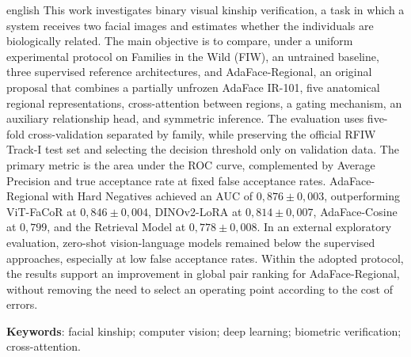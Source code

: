 \begin{resumo}[Abstract]
\begin{otherlanguage*}{english}
This work investigates binary visual kinship verification, a task in which a system receives two facial images and estimates whether the individuals are biologically related. The main objective is to compare, under a uniform experimental protocol on Families in the Wild (FIW), an untrained baseline, three supervised reference architectures, and AdaFace-Regional, an original proposal that combines a partially unfrozen AdaFace IR-101, five anatomical regional representations, cross-attention between regions, a gating mechanism, an auxiliary relationship head, and symmetric inference. The evaluation uses five-fold cross-validation separated by family, while preserving the official RFIW Track-I test set and selecting the decision threshold only on validation data. The primary metric is the area under the ROC curve, complemented by Average Precision and true acceptance rate at fixed false acceptance rates. AdaFace-Regional with Hard Negatives achieved an AUC of $0{,}876 \pm 0{,}003$, outperforming ViT-FaCoR at $0{,}846 \pm 0{,}004$, DINOv2-LoRA at $0{,}814 \pm 0{,}007$, AdaFace-Cosine at $0{,}799$, and the Retrieval Model at $0{,}778 \pm 0{,}008$. In an external exploratory evaluation, zero-shot vision-language models remained below the supervised approaches, especially at low false acceptance rates. Within the adopted protocol, the results support an improvement in global pair ranking for AdaFace-Regional, without removing the need to select an operating point according to the cost of errors.

\vspace{\onelineskip}

\noindent
\textbf{Keywords}: facial kinship; computer vision; deep learning; biometric verification; cross-attention.
\end{otherlanguage*}
\end{resumo}




